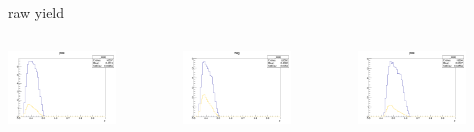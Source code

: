 \begin{frame}{raw yield}
\begin{columns}
\begin{column}[T]{0.25\textwidth}
\includegraphics[width = 0.7\textwidth]{results/yield/statistics/yield_x_Q2_z_0.50_5.500_0.40_pos.png}
\end{column}
\begin{column}[T]{0.25\textwidth}
\includegraphics[width = 0.7\textwidth]{results/yield/statistics/yield_x_Q2_z_0.50_5.500_0.40_neg.png}
\end{column}
\begin{column}[T]{0.25\textwidth}
\includegraphics[width = 0.7\textwidth]{results/yield/statistics/yield_x_Q2_z_0.50_5.500_0.50_pos.png}

\end{column}
\end{columns}
\end{frame}
